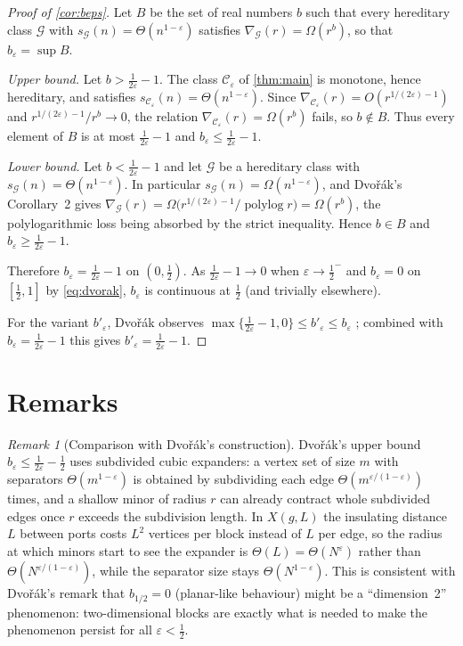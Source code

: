 \documentclass[11pt,a4paper]{article}
\theoremstyle{plain}
\theoremstyle{definition}
\theoremstyle{remark}
\newtheorem{remark}[theorem]{Remark}
\newcommand{\polylog}{\operatorname{polylog}}
\newcommand{\cC}{\mathcal C}
\newcommand{\cG}{\mathcal G}
\begin{document}
\begin{proof}[Proof of \cref{cor:beps}]
Let $B$ be the set of real numbers $b$ such that every hereditary class $\cG$ with $s_{\cG}(n)=\Theta(n^{1-\varepsilon})$ satisfies $\nabla_{\cG}(r)=\Omega(r^b)$, so that $b_\varepsilon=\sup B$.

\emph{Upper bound.} Let $b>\frac1{2\varepsilon}-1$. The class $\cC_\varepsilon$ of \cref{thm:main} is monotone, hence hereditary, and satisfies $s_{\cC_\varepsilon}(n)=\Theta(n^{1-\varepsilon})$. Since $\nabla_{\cC_\varepsilon}(r)=O(r^{1/(2\varepsilon)-1})$ and $r^{1/(2\varepsilon)-1}/r^{b}\to0$, the relation $\nabla_{\cC_\varepsilon}(r)=\Omega(r^{b})$ fails, so $b\notin B$. Thus every element of $B$ is at most $\frac1{2\varepsilon}-1$ and $b_\varepsilon\le\frac1{2\varepsilon}-1$.

\emph{Lower bound.} Let $b<\frac1{2\varepsilon}-1$ and let $\cG$ be a hereditary class with $s_{\cG}(n)=\Theta(n^{1-\varepsilon})$. In particular $s_{\cG}(n)=\Omega(n^{1-\varepsilon})$, and Dvořák's Corollary~2 \cite{Dvorak20} gives $\nabla_{\cG}(r)=\Omega\bigl(r^{1/(2\varepsilon)-1}/\polylog r\bigr)=\Omega(r^{b})$, the polylogarithmic loss being absorbed by the strict inequality. Hence $b\in B$ and $b_\varepsilon\ge\frac1{2\varepsilon}-1$.

Therefore $b_\varepsilon=\frac1{2\varepsilon}-1$ on $(0,\frac12)$. As $\frac1{2\varepsilon}-1\to0$ when $\varepsilon\to\frac12^-$ and $b_\varepsilon=0$ on $[\frac12,1]$ by \eqref{eq:dvorak}, $b_\varepsilon$ is continuous at $\frac12$ (and trivially elsewhere).

For the variant $b'_\varepsilon$, Dvořák observes $\max\{\frac1{2\varepsilon}-1,0\}\le b'_\varepsilon\le b_\varepsilon$ \cite[concluding remarks]{Dvorak20}; combined with $b_\varepsilon=\frac1{2\varepsilon}-1$ this gives $b'_\varepsilon=\frac1{2\varepsilon}-1$.
\end{proof}

\section{Remarks}\label{sec:remarks}

\begin{remark}[Comparison with Dvořák's construction]
Dvořák's upper bound $b_\varepsilon\le\frac1{2\varepsilon}-\frac12$ uses subdivided cubic expanders: a vertex set of size $m$ with separators $\Theta(m^{1-\varepsilon})$ is obtained by subdividing each edge $\Theta(m^{\varepsilon/(1-\varepsilon)})$ times, and a shallow minor of radius $r$ can already contract whole subdivided edges once $r$ exceeds the subdivision length. In $X(g,L)$ the insulating distance $L$ between ports costs $L^2$ vertices per block instead of $L$ per edge, so the radius at which minors start to see the expander is $\Theta(L)=\Theta(N^{\varepsilon})$ rather than $\Theta(N^{\varepsilon/(1-\varepsilon)})$, while the separator size stays $\Theta(N^{1-\varepsilon})$. This is consistent with Dvořák's remark that $b_{1/2}=0$ (planar-like behaviour) might be a ``dimension~2'' phenomenon: two-dimensional blocks are exactly what is needed to make the phenomenon persist for all $\varepsilon<\frac12$.
\end{remark}
\end{document}
